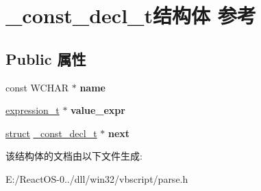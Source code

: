 \hypertarget{struct__const__decl__t}{}\section{\+\_\+const\+\_\+decl\+\_\+t结构体 参考}
\label{struct__const__decl__t}
\subsection*{Public 属性}
\begin{DoxyCompactItemize}
\item 
\mbox{\label{struct__const__decl__t_a4baac66a718d26543d280613bfbc018b}} 
const W\+C\+H\+AR $\ast$ {\bfseries name}
\item 
\mbox{\label{struct__const__decl__t_a969604122a965e113aa077d9653693d7}} 
\hyperlink{struct__expression__t}{expression\+\_\+t} $\ast$ {\bfseries value\+\_\+expr}
\item 
\mbox{\label{struct__const__decl__t_a77712be97791f490440d274ae44d48c7}} 
\hyperlink{interfacestruct}{struct} \hyperlink{struct__const__decl__t}{\+\_\+const\+\_\+decl\+\_\+t} $\ast$ {\bfseries next}
\end{DoxyCompactItemize}


该结构体的文档由以下文件生成\+:\begin{DoxyCompactItemize}
\item 
E\+:/\+React\+O\+S-\/0../dll/win32/vbscript/parse.\+h\end{DoxyCompactItemize}
